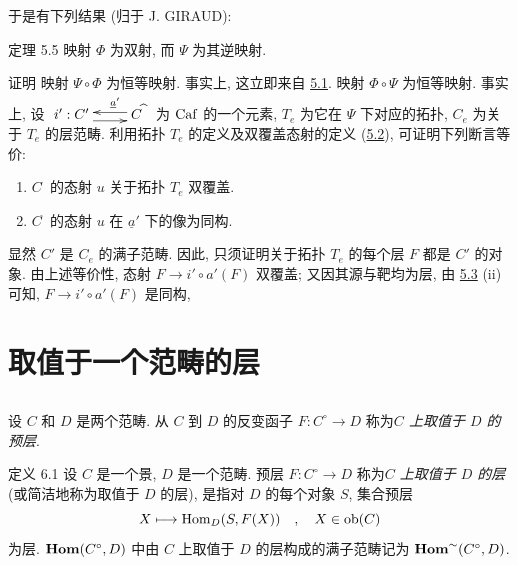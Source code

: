 于是有下列结果 (归于 J. GIRAUD):

\begin{enonce*}{定理 5.5}
映射\pageoriginale{} $\Phi$ 为双射, 而 $\Psi$ 为其逆映射.
\end{enonce*}

\begin{enonce*}[remark]{证明}
映射 $\Psi\circ \Phi$ 为恒等映射.
事实上, 这立即来自 \hyperref[II.prop5.1]{5.1}.
映射 $\Phi\circ \Psi$ 为恒等映射.
事实上, 设
$\xymatrix{ i': C' \ar@<-4pt>[r]&
\ar@<-2pt>[l]_(.35){{\underline{a}'}}
C^{\widehat{\phantom{,}}} }$
为 $\operatorname{Caf}$ 的一个元素,
$T_e$ 为它在 $\Psi$ 下对应的拓扑,
$C_e$ 为关于 $T_e$ 的层范畴.
利用拓扑 $T_e$ 的定义及双覆盖态射的定义
(\hyperref[II.def5.2]{5.2}), 可证明下列断言等价:
\begin{enumerate}
\renewcommand{\theenumi}{\roman{enumi}}
\renewcommand{\labelenumi}{\theenumi)}
\item $C^{\widehat{\phantom{,}}}$ 的态射 $u$ 关于拓扑 $T_e$ 双覆盖.

\item $C^{\widehat{\phantom{,}}}$ 的态射 $u$
在 $\underline{a}'$ 下的像为同构.
\end{enumerate}

显然 $C'$ 是 $C_e$ 的满子范畴.
因此, 只须证明关于拓扑 $T_e$ 的每个层 $F$ 都是 $C'$ 的对象.
由上述等价性, 态射 $F\rightarrow i'\circ a'(F)$ 双覆盖;
又因其源与靶均为层,
由 \hyperref[II.prop5.3]{5.3} (ii) 可知,
$F\rightarrow i'\circ a'(F)$ 是同构, \cqfd
\end{enonce*}




\section{取值于一个范畴的层}

\setcounter{subsection}{-1}
\subsection{}
设 $C$ 和 $D$ 是两个范畴.
从 $C$ 到 $D$ 的反变函子 $F:C^{\circ}\rightarrow D$
称为\emph{$C$ 上取值于 $D$ 的预层}.

\begin{enonce*}{定义 6.1}
设 $C$ 是一个景, $D$ 是一个范畴.
预层 $F:C^{\circ}\rightarrow D$
称为\emph{$C$ 上取值于 $D$ 的层}
(或简洁地称为取值于 $D$ 的层),
是指对 $D$ 的每个对象 $S$, 集合预层
$$
X\longmapsto \operatorname{Hom}_D(S,F(X))\quad,\quad X\in \operatorname{ob}(C)
$$
为层.
$\operatorname{\mathbf{Hom}}(C^{\circ},D)$ 中由 $C$ 上取值于 $D$ 的层构成的满子范畴记为
$\operatorname{\mathbf{Hom}}^{\sim}(C^{\circ},D)$.
\end{enonce*}

